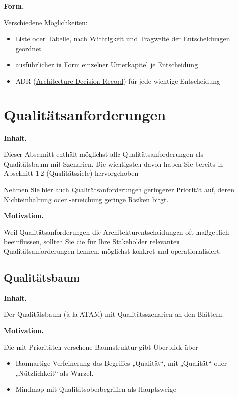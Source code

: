 \documentclass[]{article}
\begin{document}
\textbf{Form.}

Verschiedene Möglichkeiten:

\begin{itemize}
\item
  Liste oder Tabelle, nach Wichtigkeit und Tragweite der Entscheidungen
  geordnet
\item
  ausführlicher in Form einzelner Unterkapitel je Entscheidung
\item
  ADR
  (\href{http://thinkrelevance.com/blog/2011/11/15/documenting-architecture-decisions}{Architecture
  Decision Record}) für jede wichtige Entscheidung
\end{itemize}

\hypertarget{section-quality-scenarios}{%
\section{Qualitätsanforderungen}\label{section-quality-scenarios}}

\textbf{Inhalt.}

Dieser Abschnitt enthält möglichst alle Qualitätsanforderungen als
Qualitätsbaum mit Szenarien. Die wichtigsten davon haben Sie bereits in
Abschnitt 1.2 (Qualitätsziele) hervorgehoben.

Nehmen Sie hier auch Qualitätsanforderungen geringerer Priorität auf,
deren Nichteinhaltung oder -erreichung geringe Risiken birgt.

\textbf{Motivation.}

Weil Qualitätsanforderungen die Architekturentscheidungen oft maßgeblich
beeinflussen, sollten Sie die für Ihre Stakeholder relevanten
Qualitätsanforderungen kennen, möglichst konkret und operationalisiert.

\hypertarget{_qualit_tsbaum}{%
\subsection{Qualitätsbaum}\label{_qualit_tsbaum}}

\textbf{Inhalt.}

Der Qualitätsbaum (à la ATAM) mit Qualitätsszenarien an den Blättern.

\textbf{Motivation.}

Die mit Prioritäten versehene Baumstruktur gibt Überblick über

\begin{itemize}
\item
  Baumartige Verfeinerung des Begriffes „Qualität``, mit „Qualität``
  oder „Nützlichkeit`` als Wurzel.
\item
  Mindmap mit Qualitätsoberbegriffen als Hauptzweige
\end{itemize}
\end{document}
